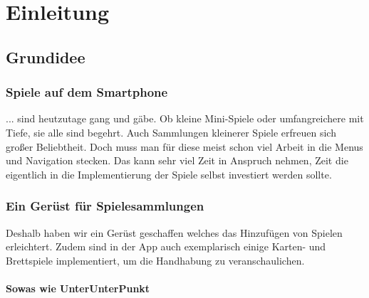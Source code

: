 \section{Einleitung}

\subsection{Grundidee}

\subsubsection{Spiele auf dem Smartphone}
... sind heutzutage gang und gäbe. Ob kleine Mini-Spiele oder umfangreichere mit Tiefe, sie alle sind begehrt. Auch Sammlungen kleinerer Spiele erfreuen sich großer Beliebtheit.
Doch muss man für diese meist schon viel Arbeit in die Menus und Navigation stecken. Das kann sehr viel Zeit in Anspruch nehmen, 
Zeit die eigentlich in die Implementierung der Spiele selbst investiert werden sollte.
\subsubsection{Ein Gerüst für Spielesammlungen}
Deshalb haben wir ein Gerüst geschaffen welches das Hinzufügen von Spielen erleichtert. Zudem sind in der App auch exemplarisch einige Karten- 
und Brettspiele implementiert, um die Handhabung zu veranschaulichen.

\paragraph{Sowas wie UnterUnterPunkt}